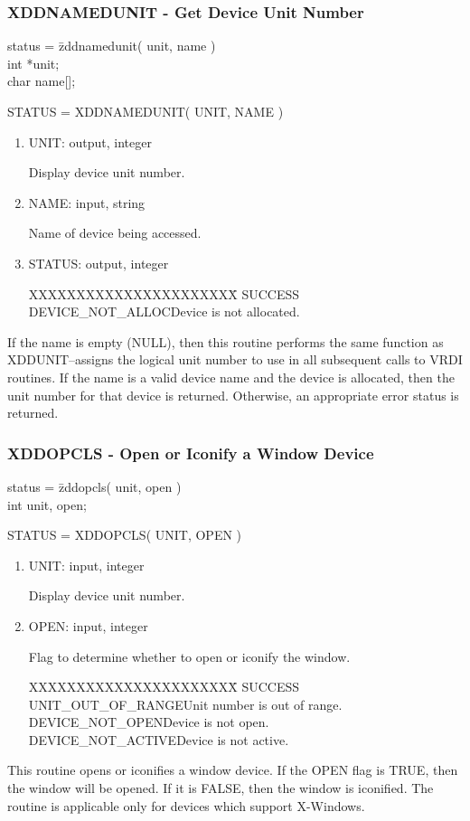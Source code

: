 \subsubsection{XDDNAMEDUNIT - Get Device Unit Number}
\begin{tabbing}
status = \=zddnamedunit( unit, name )\\
\>int  *unit;\\
\>char  name[];\\
\end{tabbing}
STATUS = XDDNAMEDUNIT( UNIT, NAME )
\begin{enumerate}
\item UNIT:  output, integer

Display device unit number.
\item NAME:  input, string

Name of device being accessed.
\item STATUS:  output, integer
\begin{tabbing}
XXXXXXXXXXXXXXXXXXXXXX\=\kill
SUCCESS\\
DEVICE\_NOT\_ALLOC\>Device is not allocated.\\
\end{tabbing}
\end{enumerate}
If the name is empty (NULL), then this routine performs the same
function as XDDUNIT--assigns the logical unit number to use in
all subsequent calls to VRDI routines.  If the name is a valid
device name and the device is allocated, then the unit number for
that device is returned.  Otherwise, an appropriate error status
is returned.
\newpage
\subsubsection{XDDOPCLS - Open or Iconify a Window Device}
\begin{tabbing}
status = \=zddopcls( unit, open )\\
\>int  unit, open;\\
\end{tabbing}
STATUS = XDDOPCLS( UNIT, OPEN )
\begin{enumerate}
\item UNIT:  input, integer

Display device unit number.
\item OPEN:  input, integer

Flag to determine whether to open or iconify the window.
\begin{tabbing}
XXXXXXXXXXXXXXXXXXXXXX\=\kill
SUCCESS\\
UNIT\_OUT\_OF\_RANGE\>Unit number is out of range.\\
DEVICE\_NOT\_OPEN\>Device is not open.\\
DEVICE\_NOT\_ACTIVE\>Device is not active.\\
\end{tabbing}
\end{enumerate}
This routine opens or iconifies a window device.  If the OPEN flag is TRUE,
then the window will be opened.  If it is FALSE, then the window is
iconified.  The routine is applicable only for devices which support X-Windows.
\newpage
